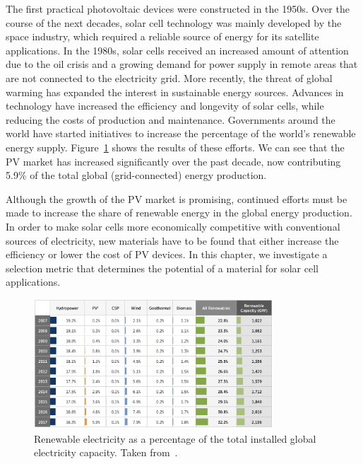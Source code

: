 \begin{refsection}
The first practical photovoltaic devices were constructed in the 1950s. Over the course of the next decades, solar cell technology was mainly developed by the space industry, which required a reliable source of energy for its satellite applications. In the 1980s, solar cells received an increased amount of attention due to the oil crisis and a growing demand for power supply in remote areas that are not connected to the electricity grid. More recently, the threat of global warming has expanded the interest in sustainable energy sources. Advances in technology have increased the efficiency and longevity of solar cells, while reducing the costs of production and maintenance. Governments around the world have started initiatives to increase the percentage of the world's renewable energy supply. Figure~\ref{fig:slme-pv_evo} shows the results of these efforts. We can see that the PV market has increased significantly over the past decade, now contributing 5.9\% of the total global (grid-connected) energy production.

Although the growth of the PV market is promising, continued efforts must be made to increase the share of renewable energy in the global energy production. In order to make solar cells more economically competitive with conventional sources of electricity, new materials have to be found that either increase the efficiency or lower the cost of PV devices. In this chapter, we investigate a selection metric that determines the potential of a material for solar cell applications.

\begin{figure}[!htp] 
\centering
\includegraphics[width=0.8\textwidth]{./Figures/slme/pv-evo.png}
\caption{Renewable electricity as a percentage of the total installed global electricity capacity. Taken from~\cite{NREL2017}.}
\label{fig:slme-pv_evo} 
\end{figure}



\end{refsection}
